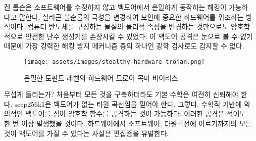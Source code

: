 \begin{comment}
The Ken Thompson Hack is a particularly ingenious and hard-to-detect backdoor,
so let's take a quick look at a hard-to-detect backdoor which works without
modifying any software. Researchers found a way to compromise security-critical
hardware by altering the polarity of silicon
impurities.~\cite{becker2013stealthy} Just by changing the physical properties
of the stuff that computer chips are made of they were able to compromise a
cryptographically secure random number generator. Since this change can't be
seen, the backdoor can't be detected by optical inspection, which is one of the
most important tamper-detection mechanism for chips like these.
\end{comment}
켄 톰슨은 소프트웨어를 수정하지 않고 백도어에서 은밀하게 동작하는 해킹이 가능하다고 말한다.
실리콘 불순물의 극성을 변경하여 보안에 중요한 하드웨어를 위조하는 방식이다\cite{becker2013stealthy}.
컴퓨터 반도체를 구성하는 물질의 물리적 속성을 변경하는 것만으로도 암호학적으로 안전한 난수 생성기를 손상시킬 수 있었다.
이 백도어 공격은 눈으로 볼 수 없기 때문에 가장 강력한 해킹 방지 메커니즘 중의 하나인 광학 검사로도 감지할 수 없다.

\begin{figure}
  \texttt{[image: assets/images/stealthy-hardware-trojan.png]}
  \caption{은밀한 도판트 레벨의 하드웨어 트로이 목마 바이러스}
  \label{fig:stealthy-hardware-trojan}
\end{figure}

\begin{comment}
Sounds scary? Well, even if you would be able to build everything from
scratch, you would still have to trust the underlying mathematics. You
would have to trust that \textit{secp256k1} is an elliptic curve without
backdoors. Yes, malicious backdoors can be inserted in the mathematical
foundations of cryptographic functions and arguably this has already
happened at least once.~\cite{wiki:Dual_EC_DRBG} There are good reasons to be paranoid, and the
fact that everything from your hardware, to your software, to the
elliptic curves used can have backdoors~\cite{wiki:backdoors} are some of them.
\end{comment}
무섭게 들리는가? 처음부터 모든 것을 구축하더라도 기본 수학은 여전히 신뢰해야 한다.
secp256k1은 백도어가 없는 타원 곡선임을 믿어야 한다.
그렇다. 수학적 기반에 악의적인 백도어를 심어 암호학 함수를 공격하는 것이 가능하다. 
이러한 공격은 적어도 한 번 이상 발생했을 것이다\cite{wiki:Dual_EC_DRBG}.
하드웨어에서 소프트웨어, 타원곡선에 이르기까지의 모든 것이 백도어\cite{wiki:backdoors}를 가질 수 있다는 사실은
편집증을 유발한다.


